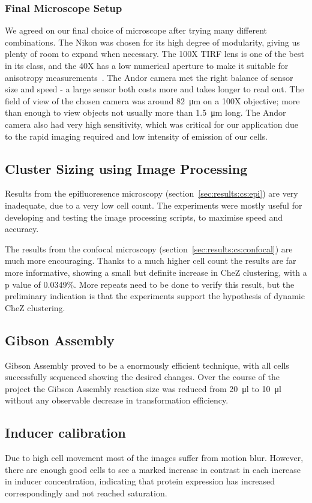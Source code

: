 \documentclass[../main.tex]{subfiles}
\begin{document}
\subsubsection{Final Microscope Setup}

We agreed on our final choice of microscope after trying many different combinations. The Nikon was chosen for its high degree of modularity, giving us plenty of room to expand when necessary. The 100X TIRF lens is one of the best in its class, and the 40X has a low numerical aperture to make it suitable for anisotropy measurements~\citep{lakowicz}. The Andor camera met the right balance of sensor size and speed - a large sensor both costs more and takes longer to read out. The field of view of the chosen camera was around \SI{82}{\micro\meter} on a 100X objective; more than enough to view objects not usually more than \SI{1.5}{\micro\meter} long. The Andor camera also had very high sensitivity, which was critical for our application due to the rapid imaging required and low intensity of emission of our cells.

\subsection{Cluster Sizing using Image Processing}

Results from the epifluoresence microscopy (section~\ref{sec:results:cs:epi}) are very inadequate, due to a very low cell count. The experiments were mostly useful for developing and testing the image processing scripts, to maximise speed and accuracy.

The results from the confocal microscopy (section~\ref{sec:results:cs:confocal}) are much more encouraging. Thanks to a much higher cell count the results are far more informative, showing a small but definite increase in CheZ clustering, with a p value of 0.0349\%. More repeats need to be done to verify this result, but the preliminary indication is that the experiments support the hypothesis of dynamic CheZ clustering.

\subsection{Gibson Assembly}
Gibson Assembly proved to be a enormously efficient technique, with all cells successfully sequenced showing the desired changes. Over the course of the project the Gibson Assembly reaction size was reduced from \SI{20}{\micro\litre} to \SI{10}{\micro\litre} without any observable decrease in transformation efficiency. 

\subsection{Inducer calibration}

Due to high cell movement most of the images suffer from motion blur. However, there are enough good cells to see a marked increase in contrast in each increase in inducer concentration, indicating that protein expression has increased correspondingly and not reached saturation.
\end{document}
